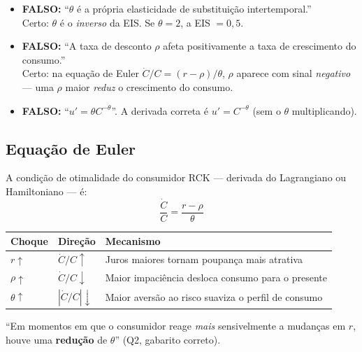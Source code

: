 \documentclass[12pt, a4paper]{article}
\begin{document}
\begin{armbox}[title={Armadilhas recorrentes (Q1/Q2 P1-2025)}]
\begin{itemize}[leftmargin=*]
  \item \textbf{FALSO:} ``$\theta$ é a própria elasticidade de substituição intertemporal.'' \\ Certo: $\theta$ é o \emph{inverso} da EIS. Se $\theta=2$, a EIS $= 0{,}5$.
  \item \textbf{FALSO:} ``A taxa de desconto $\rho$ afeta positivamente a taxa de crescimento do consumo.'' \\ Certo: na equação de Euler $\dot C/C = (r-\rho)/\theta$, $\rho$ aparece com sinal \emph{negativo} — uma $\rho$ maior \emph{reduz} o crescimento do consumo.
  \item \textbf{FALSO:} ``$u' = \theta C^{-\theta}$''. A derivada correta é $u' = C^{-\theta}$ (sem o $\theta$ multiplicando).
\end{itemize}
\end{armbox}

\subsection{Equação de Euler}

A condição de otimalidade do consumidor RCK — derivada do Lagrangiano ou Hamiltoniano — é:
\[
  \boxed{\frac{\dot C}{C} = \frac{r - \rho}{\theta}}
\]

\begin{fatorbox}[title={Interpretação dos parâmetros}]
\begin{center}
\begin{tabular}{lll}
\toprule
Choque & Direção & Mecanismo \\
\midrule
$r\uparrow$ & $\dot C/C\uparrow$ & Juros maiores tornam poupança mais atrativa \\
$\rho\uparrow$ & $\dot C/C\downarrow$ & Maior impaciência desloca consumo para o presente \\
$\theta\uparrow$ & $|\dot C/C|\downarrow$ & Maior aversão ao risco suaviza o perfil de consumo \\
\bottomrule
\end{tabular}
\end{center}
``Em momentos em que o consumidor reage \emph{mais} sensivelmente a mudanças em $r$, houve uma \textbf{redução} de $\theta$'' (Q2, gabarito correto).
\end{fatorbox}
\end{document}

